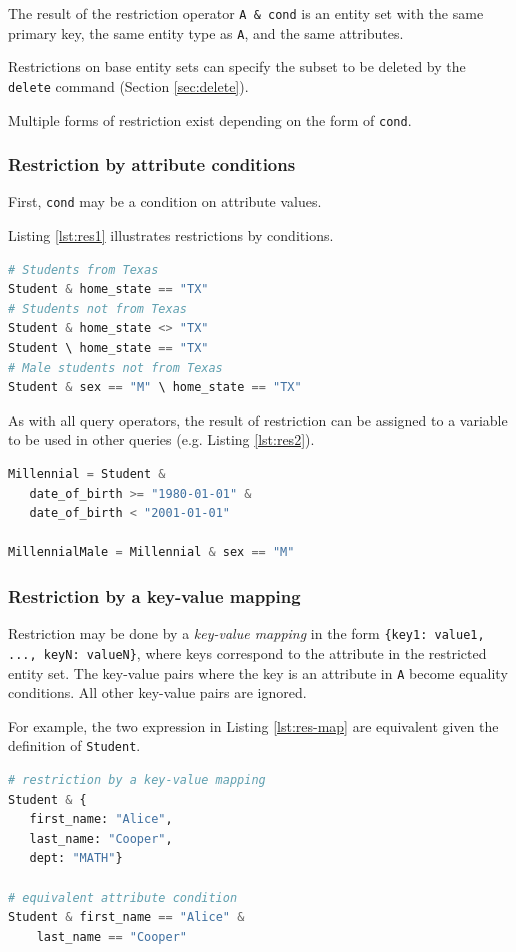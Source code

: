 \documentclass[letter,10pt]{article}
\begin{document}
The result of the restriction operator \lstinline$A & cond$ is an entity set with the same primary key, the same entity type as \lstinline$A$, and the same attributes.

Restrictions on base entity sets can specify the subset to be deleted by the \lstinline$delete$ command (Section \ref{sec:delete}).

Multiple forms of restriction exist depending on the form of \lstinline$cond$.

\subsubsection{Restriction by attribute conditions}
First, \lstinline$cond$ may be a condition on attribute values.  

Listing \ref{lst:res1} illustrates restrictions by conditions.
\begin{lstlisting}[language=Python, caption={Restrictions by attribute conditions.}, label={lst:res1}]
# Students from Texas
Student & home_state == "TX"
# Students not from Texas
Student & home_state <> "TX"
Student \ home_state == "TX"
# Male students not from Texas
Student & sex == "M" \ home_state == "TX"
\end{lstlisting}

As with all query operators, the result of restriction can be assigned to a variable to be used in other queries (e.g. Listing \ref{lst:res2}).
\begin{lstlisting}[language=Python, caption={Assignment and use of relational variables.}, label={lst:res2}]
Millennial = Student & 
   date_of_birth >= "1980-01-01" & 
   date_of_birth < "2001-01-01"

MillennialMale = Millennial & sex == "M"
\end{lstlisting}

\subsubsection{Restriction by a key-value mapping}
Restriction may be done by a \emph{key-value mapping} in the form \lstinline${key1: value1, ..., keyN: valueN}$, where 
keys correspond to the attribute in the restricted entity set.  
The key-value pairs where the key is an attribute in \lstinline$A$ become equality conditions. 
All other key-value pairs are ignored.  

For example, the two expression in Listing \ref{lst:res-map} are equivalent given the definition of \lstinline$Student$.
\begin{lstlisting}[language=Python, caption={Equivalent expressions using restrictions by a mapping and by attribute conditions.  The condition on \lstinline$dept$ is ignored because it is not an attribute in \lstinline$Student$.}, label={lst:res-map}]
# restriction by a key-value mapping
Student & {
   first_name: "Alice", 
   last_name: "Cooper", 
   dept: "MATH"}

# equivalent attribute condition 
Student & first_name == "Alice" & 
    last_name == "Cooper"
\end{lstlisting}
\end{document}
